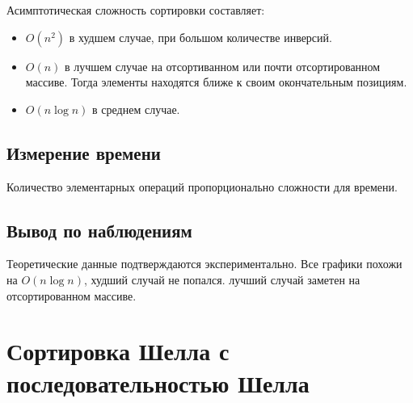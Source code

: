 \documentclass[11pt]{article}
\begin{document}
\begin{center}
\end{center}
{ \hspace*{\fill} }

Асимптотическая сложность сортировки составляет:
\begin{itemize}
    \item $O(n^2)$ в худшем случае, при большом количестве инверсий.
    \item $O(n)$ в лучшем случае на отсортиванном или почти отсортированном массиве. Тогда элементы находятся ближе к своим окончательным
    позициям.
    \item $O(n\log n)$ в среднем случае.
\end{itemize}

\subsection{Измерение времени}

\begin{center}
\end{center}
{ \hspace*{\fill} }

\begin{center}
\end{center}
{ \hspace*{\fill} }

Количество элементарных операций пропорционально сложности для времени.

\subsection{Вывод по наблюдениям}

Теоретические данные подтверждаются экспериментально. Все графики похожи на $O(n\log n)$,
худший случай не попался. лучший случай заметен на отсортированном массиве.

\newpage

\setcounter{section}{13}
\section*{\centering Сортировка Шелла с последовательностью Шелла}
\end{document}
